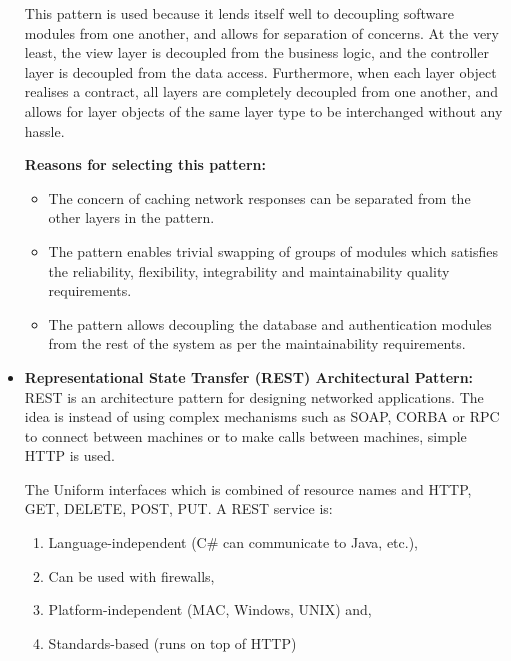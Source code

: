 \documentclass[a4paper,10pt]{article}
\begin{document}
\begin{itemize}
		This pattern is used because it lends itself well to decoupling software modules from one another, and allows for separation of concerns. At the very least, the view layer is decoupled from the business logic, and the controller layer is decoupled from the data access. Furthermore, when each layer object realises a contract, all layers are completely decoupled from one another, and allows for layer objects of the same layer type to be interchanged without any hassle. 
		
		\subitem \textbf{Reasons for selecting this pattern:}
		\begin{itemize}
			\item The concern of caching network responses can be separated from the other layers in the pattern.
			\item The pattern enables trivial swapping of groups of modules which satisfies the reliability, flexibility, integrability and maintainability quality requirements.
			\item The pattern allows decoupling the database and authentication modules from the rest of the system as per the maintainability requirements.
		\end{itemize}
		
		\item \textbf{Representational State Transfer (REST) Architectural Pattern:}\\
		REST is an architecture pattern for designing networked applications. The idea is instead of using complex mechanisms such as SOAP, CORBA or RPC to connect between machines or to make calls between machines, simple HTTP is used.
		
		The Uniform interfaces which is combined of resource names and HTTP, GET, DELETE, POST, PUT.
			A REST service is:
		\begin{enumerate}
			\item Language-independent (C\# can communicate to Java, etc.),
			\item Can be used with firewalls,
			\item Platform-independent (MAC, Windows, UNIX) and,
			\item Standards-based (runs on top of HTTP)
		\end{enumerate}
		

\end{itemize}
\end{document}
